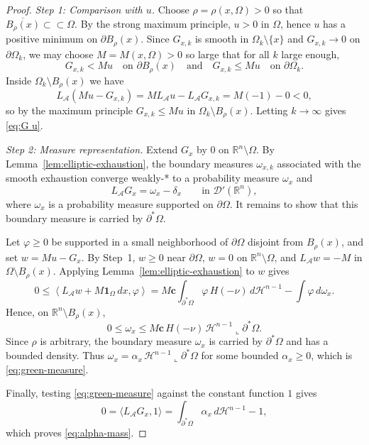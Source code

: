 \documentclass[reqno,11pt]{amsart}
\numberwithin{equation}{section}
\theoremstyle{remark}
\begin{document}
\begin{proof}
\emph{Step 1: Comparison with $u$.}
Choose $\rho=\rho(x,\Omega)>0$ so that $\overline{B_\rho(x)}\subset\subset\Omega$.
By the strong maximum principle, $u>0$ in $\Omega$, hence $u$ has a positive minimum on $\partial B_\rho(x)$.
Since $G_{x,k}$ is smooth in $\Omega_k\setminus\{x\}$ and $G_{x,k}\to 0$ on $\partial\Omega_k$, we may choose
$M=M(x,\Omega)>0$ so large that for all $k$ large enough,
\[
G_{x,k}<Mu \quad \text{on }\partial B_\rho(x)\quad\text{and}\quad G_{x,k}\le Mu \quad\text{on }\partial\Omega_k.
\]
Inside $\Omega_k\setminus B_\rho(x)$ we have
\[
L_{\mathcal A}(Mu-G_{x,k})=M L_{\mathcal A}u - L_{\mathcal A}G_{x,k}=M(-1)-0<0,
\]
so by the maximum principle $G_{x,k}\le Mu$ in $\Omega_k\setminus B_\rho(x)$.
Letting $k\to\infty$ gives \eqref{eq:G u}.

\smallskip
\emph{Step 2: Measure representation.}
{Extend $G_x$ by $0$ on $\mathbb R^n\setminus\Omega$. By Lemma~\ref{lem:elliptic-exhaustion}, the
boundary measures $\omega_{x,k}$ associated with the smooth exhaustion converge weakly-* to a probability measure
$\omega_x$ and}
\[
{
L_{\mathcal A}G_x=\omega_x-\delta_x
\qquad\text{in }\mathscr D'(\mathbb R^n),
}
\]
{where $\omega_x$ is a probability measure supported on $\partial\Omega$. It remains to show that this boundary
measure is carried by $\partial^*\Omega$.}

{Let $\varphi\ge0$ be supported in a small neighborhood of $\partial\Omega$ disjoint from $B_\rho(x)$, and set
$w=Mu-G_x$. By Step~1, $w\ge0$ near $\partial\Omega$, $w=0$ on $\mathbb R^n\setminus\Omega$, and
$L_{\mathcal A}w=-M$ in $\Omega\setminus B_\rho(x)$. Applying 
Lemma~\ref{lem:elliptic-exhaustion} to $w$ gives}
\[
{
0\le \left\langle L_{\mathcal A}w+M\mathbf 1_\Omega\,dx,\varphi\right\rangle
=M\mathbf c\int_{\partial^*\Omega}\varphi\,H(-\nu)\,d\mathscr H^{n-1}
-\int \varphi\,d\omega_x .
}
\]
{Hence, on $\mathbb R^n\setminus B_\rho(x)$,}
\[
{
0\le \omega_x\le M\mathbf c\,H(-\nu)\,\mathscr H^{n-1}\llcorner\partial^*\Omega .
}
\]
{Since $\rho$ is arbitrary, the boundary measure $\omega_x$ is carried by
$\partial^*\Omega$ and has a bounded density. Thus
$\omega_x=\alpha_x\,\mathscr H^{n-1}\llcorner\partial^*\Omega$ for some bounded $\alpha_x\ge0$, which is
\eqref{eq:green-measure}.}

Finally, testing \eqref{eq:green-measure} against the constant function $1$ gives
\[
0=\langle L_{\mathcal A}G_x,1\rangle=\int_{\partial^*\Omega}\alpha_x\,d\mathscr H^{n-1}-1,
\]
which proves \eqref{eq:alpha-mass}.
\end{proof}
\end{document}
